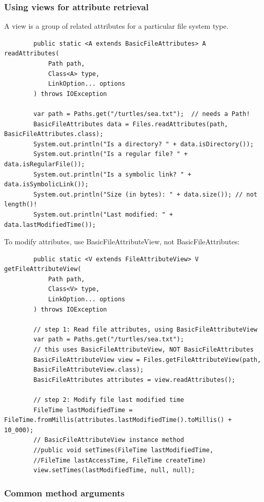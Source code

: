 \documentclass{scrartcl}
\begin{document}
\subsubsection{Using views for attribute retrieval}

    A view is a group of related attributes for a particular file system type.

    \begin{lstlisting}
        public static <A extends BasicFileAttributes> A readAttributes(
            Path path,
            Class<A> type,
            LinkOption... options
        ) throws IOException

        var path = Paths.get("/turtles/sea.txt");  // needs a Path!
        BasicFileAttributes data = Files.readAttributes(path, BasicFileAttributes.class);
        System.out.println("Is a directory? " + data.isDirectory());
        System.out.println("Is a regular file? " + data.isRegularFile());
        System.out.println("Is a symbolic link? " + data.isSymbolicLink());
        System.out.println("Size (in bytes): " + data.size()); // not length()!
        System.out.println("Last modified: " + data.lastModifiedTime());
    \end{lstlisting}

    To modify attributes, use BasicFileAttributeView, not BasicFileAttributes:

    \begin{lstlisting}
        public static <V extends FileAttributeView> V getFileAttributeView(
            Path path,
            Class<V> type,
            LinkOption... options
        ) throws IOException

        // step 1: Read file attributes, using BasicFileAttributeView
        var path = Paths.get("/turtles/sea.txt");
        // this uses BasicFileAttributeView, NOT BasicFileAttributes
        BasicFileAttributeView view = Files.getFileAttributeView(path,
        BasicFileAttributeView.class);
        BasicFileAttributes attributes = view.readAttributes();

        // step 2: Modify file last modified time
        FileTime lastModifiedTime = FileTime.fromMillis(attributes.lastModifiedTime().toMillis() + 10_000);
        // BasicFileAttributeView instance method
        //public void setTimes(FileTime lastModifiedTime,
        //FileTime lastAccessTime, FileTime createTime)
        view.setTimes(lastModifiedTime, null, null);
    \end{lstlisting}

\subsubsection{Common method arguments}
\end{document}
